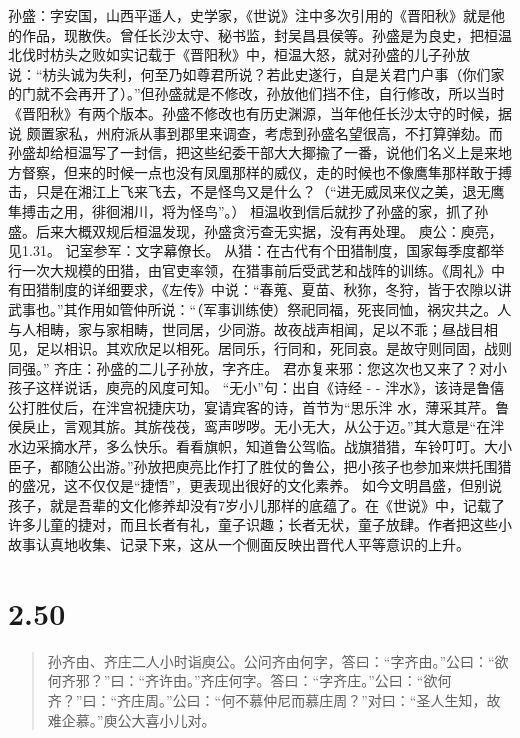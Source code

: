 \documentclass[]{book}
\begin{document}
孙盛：字安国，山西平遥人，史学家，《世说》注中多次引用的《晋阳秋》就是他的作品，现散佚。曾任长沙太守、秘书监，封吴昌县侯等。孙盛是为良史，把桓温北伐时枋头之败如实记载于《晋阳秋》中，桓温大怒，就对孙盛的儿子孙放说：``枋头诚为失利，何至乃如尊君所说？若此史遂行，自是关君门户事（你们家的门就不会再开了）。''但孙盛就是不修改，孙放他们挡不住，自行修改，所以当时《晋阳秋》有两个版本。孙盛不修改也有历史渊源，当年他任长沙太守的时候，据说
颇置家私，州府派从事到郡里来调查，考虑到孙盛名望很高，不打算弹劾。而孙盛却给桓温写了一封信，把这些纪委干部大大揶揄了一番，说他们名义上是来地方督察，但来的时候一点也没有凤凰那样的威仪，走的时候也不像鹰隼那样敢于搏击，只是在湘江上飞来飞去，不是怪鸟又是什么？（``进无威凤来仪之美，退无鹰隼搏击之用，徘徊湘川，将为怪鸟''。）
桓温收到信后就抄了孙盛的家，抓了孙盛。后来大概双规后桓温发现，孙盛贪污查无实据，没有再处理。
庾公：庾亮，见1.31。 记室参军：文字幕僚长。
从猎：在古代有个田猎制度，国家每季度都举行一次大规模的田猎，由官吏率领，在猎事前后受武艺和战阵的训练。《周礼》中有田猎制度的详细要求，《左传》中说：``春蒐、夏苗、秋狝，冬狩，皆于农隙以讲武事也。''其作用如管仲所说：``（军事训练使）祭祀同福，死丧同恤，祸灾共之。人与人相畴，家与家相畴，世同居，少同游。故夜战声相闻，足以不乖；昼战目相见，足以相识。其欢欣足以相死。居同乐，行同和，死同哀。是故守则同固，战则同强。''
齐庄：孙盛的二儿子孙放，字齐庄。
君亦复来邪：您这次也又来了？对小孩子这样说话，庾亮的风度可知。
``无小''句：出自《诗经 - -
泮水》，该诗是鲁僖公打胜仗后，在泮宫祝捷庆功，宴请宾客的诗，首节为``思乐泮
水，薄采其芹。鲁侯戾止，言观其旂。其旂茷茷，鸾声哕哕。无小无大，从公于迈。''其大意是``在泮水边采摘水芹，多么快乐。看看旗帜，知道鲁公驾临。战旗猎猎，车铃叮叮。大小臣子，都随公出游。''孙放把庾亮比作打了胜仗的鲁公，把小孩子也参加来烘托围猎的盛况，这不仅仅是``捷悟''，更表现出很好的文化素养。
如今文明昌盛，但别说孩子，就是吾辈的文化修养却没有7岁小儿那样的底蕴了。在《世说》中，记载了许多儿童的捷对，而且长者有礼，童子识趣；长者无状，童子放肆。作者把这些小故事认真地收集、记录下来，这从一个侧面反映出晋代人平等意识的上升。

\section{2.50}\label{section-96}

\begin{quote}
孙齐由、齐庄二人小时诣庾公。公问齐由何字，答曰：``字齐由。''公曰：``欲何齐邪？''曰：``齐许由。''齐庄何字。答曰：``字齐庄。''公曰：``欲何齐？''曰：``齐庄周。''公曰：``何不慕仲尼而慕庄周？''对曰：``圣人生知，故难企慕。''庾公大喜小儿对。
\end{quote}
\end{document}
